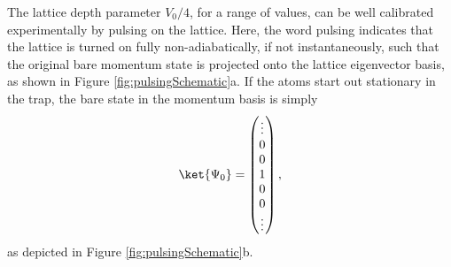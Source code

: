 The lattice depth parameter $V_0/4$, for a range of values, can be well calibrated experimentally by pulsing on the lattice. Here, the word pulsing indicates that the lattice is turned on fully non-adiabatically, if not instantaneously, such that the original bare momentum state is projected onto the lattice eigenvector basis, as shown in Figure \ref{fig:pulsingSchematic}a. If the atoms start out stationary in the trap, the bare state in the momentum basis is simply
\begin{equation}
\ket{\Psi_0} = \begin{pmatrix} \vdots \\
0\\
0\\
1\\
0\\
0\\
\vdots
\end{pmatrix} \\,
\end{equation}
as depicted in  Figure \ref{fig:pulsingSchematic}b.

